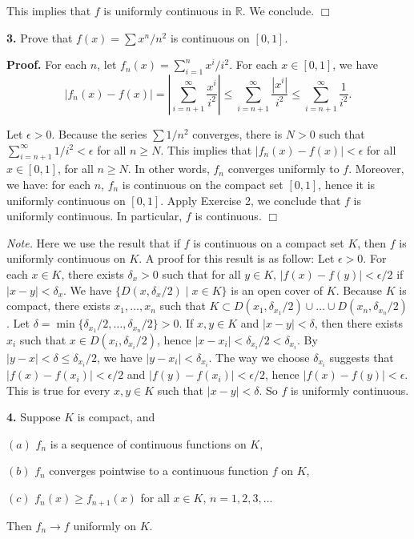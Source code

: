 \documentclass{article}
\begin{document}
This implies that $f$ is uniformly continuous in $\mathbb{R}$. We
conclude. $\Box$

    \textbf{3.} Prove that $f(x) = \sum x^n/n^2$ is continuous on $[0,1]$.

\textbf{Proof.} For each $n$, let $f_n(x) = \sum_{i=1}^{n} x^i/i^2$. For
each $x\in [0,1]$, we have \[
|f_n(x) - f(x)| = \left|\sum_{i=n+1}^{\infty} \frac{x^i}{i^2}\right| \le \sum_{i=n+1}^{\infty}\frac{|x^i|}{i^2} \le \sum_{i=n+1}^{\infty} \frac{1}{i^2}.\]

Let $\epsilon > 0$. Because the series $\sum 1/n^2$ converges, there is
$N> 0$ such that $\sum_{i=n+1}^{\infty}1/i^2 < \epsilon$ for all
$n \ge N$. This implies that $|f_n(x) - f(x)| < \epsilon$ for all
$x\in [0,1]$, for all $n\ge N$. In other words, $f_n$ converges
uniformly to $f$. Moreover, we have: for each $n$, $f_n$ is continuous
on the compact set $[0,1]$, hence it is uniformly continuous on $[0,1]$.
Apply Exercise 2, we conclude that $f$ is uniformly continuous. In
particular, $f$ is continuous. $\Box$

\emph{Note.} Here we use the result that if $f$ is continuous on a
compact set $K$, then $f$ is uniformly continuous on $K$. A proof for
this result is as follow: Let $\epsilon > 0$. For each $x\in K$, there
exists $\delta_x > 0$ such that for all $y\in K$,
$|f(x) - f(y)| < \epsilon / 2$ if $|x-y| < \delta_x$. We have
$\{D(x,\delta_x/2)\mid x\in K\}$ is an open cover of $K$. Because $K$ is
compact, there exists $x_1 ,\ldots,x_n$ such that
$K \subset D(x_1 ,\delta_{x_1}/2) \cup\ldots\cup D(x_n,\delta_{x_n}/2)$.
Let $\delta = \min\{\delta_{x_1}/2,\ldots, \delta_{x_n}/2\} > 0$. If
$x,y\in K$ and $|x-y| < \delta$, then there exists $x_i$ such that
$x\in D(x_i,\delta_{x_i}/2)$, hence
$|x-x_i| < \delta_{x_i}/2 < \delta_{x_i}$. By
$|y-x| < \delta \le \delta_{x_i}/2$, we have $|y-x_i| < \delta_{x_i}$.
The way we choose $\delta_{x_i}$ suggests that
$|f(x) - f(x_i)| < \epsilon/2$ and $|f(y) - f(x_i)| < \epsilon /2$,
hence $|f(x) - f(y)|< \epsilon$. This is true for every $x,y \in K$ such
that $|x-y| < \delta$. So $f$ is uniformly continuous.

    \textbf{4.} Suppose $K$ is compact, and

$(a)$ $f_n$ is a sequence of continuous functions on $K$,

$(b)$ $f_n$ converges pointwise to a continuous function $f$ on $K$,

$(c)$ $f_n(x) \ge f_{n+1}(x)$ for all $x\in K$, $n=1,2,3,\ldots$

Then $f_n\to f$ uniformly on $K$.
\end{document}
